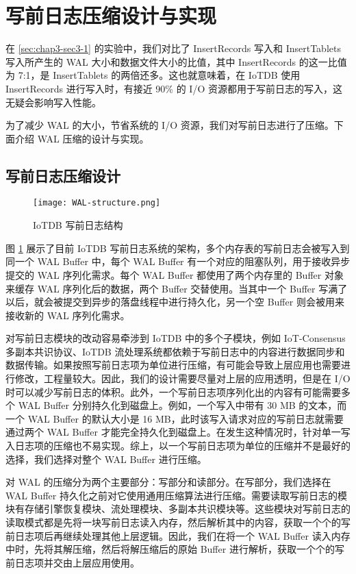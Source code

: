 \section{写前日志压缩设计与实现\label{sec:chap7-sec4}}
在 \ref{sec:chap3-sec3-1} 的实验中，我们对比了 InsertRecords 写入和 InsertTablets 写入所产生的 WAL 大小和数据文件大小的比值，其中 InsertRecords 的这一比值为 7:1，是 InsertTablets 的两倍还多。这也就意味着，在 IoTDB 使用 InsertRecords 进行写入时，有接近 90\% 的 I/O 资源都用于写前日志的写入，这无疑会影响写入性能。

为了减少 WAL 的大小，节省系统的 I/O 资源，我们对写前日志进行了压缩。下面介绍 WAL 压缩的设计与实现。
\subsection{写前日志压缩设计}
\begin{figure}
  \centering
  \texttt{[image: WAL-structure.png]}
  \caption{IoTDB 写前日志结构\cite{朱海铭2023面向内存表的可动态配置预写日志框架}}
  \label{fig:wal-compress-design}
\end{figure}

图 \ref{fig:wal-compress-design} 展示了目前 IoTDB 写前日志系统的架构，多个内存表的写前日志会被写入到同一个 WAL Buffer 中，每个 WAL Buffer 有一个对应的阻塞队列，用于接收异步提交的 WAL 序列化需求。每个 WAL Buffer 都使用了两个内存里的 Buffer 对象来缓存 WAL 序列化后的数据，两个 Buffer 交替使用。当其中一个 Buffer 写满了以后，就会被提交到异步的落盘线程中进行持久化，另一个空 Buffer 则会被用来接收新的 WAL 序列化需求。

对写前日志模块的改动容易牵涉到 IoTDB 中的多个子模块，例如 IoT-Consensus 多副本共识协议、IoTDB 流处理系统都依赖于写前日志中的内容进行数据同步和数据传输。如果按照写前日志项为单位进行压缩，有可能会导致上层应用也需要进行修改，工程量较大。因此，我们的设计需要尽量对上层的应用透明，但是在 I/O 时可以减少写前日志的体积。此外，一个写前日志项序列化出的内容有可能需要多个 WAL Buffer 分别持久化到磁盘上。例如，一个写入中带有 30 MB 的文本，而一个 WAL Buffer 的默认大小是 16 MB，此时该写入请求对应的写前日志就需要通过两个 WAL Buffer 才能完全持久化到磁盘上。在发生这种情况时，针对单一写入日志项的压缩也不易实现。综上，以一个写前日志项为单位的压缩并不是最好的选择，我们选择对整个 WAL Buffer 进行压缩。

对 WAL 的压缩分为两个主要部分：写部分和读部分。在写部分，我们选择在 WAL Buffer 持久化之前对它使用通用压缩算法进行压缩。需要读取写前日志的模块有存储引擎恢复模块、流处理模块、多副本共识模块等。这些模块对写前日志的读取模式都是先将一块写前日志读入内存，然后解析其中的内容，获取一个个的写前日志项后再继续处理其他上层逻辑。因此，我们在将一个 WAL Buffer 读入内存中时，先将其解压缩，然后将解压缩后的原始 Buffer 进行解析，获取一个个的写前日志项并交由上层应用使用。
